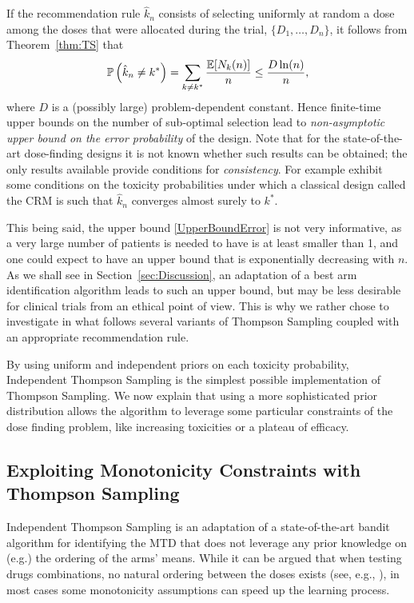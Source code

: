 If the recommendation rule $\hat{k}_n$ consists of selecting uniformly at random a dose among the doses that were allocated during the trial,  $\{D_1,\dots,D_n\}$, it follows from Theorem~\ref{thm:TS} that 
\begin{equation}\mathbb{P}\left(\hat k_n \neq k^*\right) = \sum_{k \neq k^*} \frac{\mathbb{E}[N_k(n)]}{n} \leq \frac{D\ln(n)}{n},\label{UpperBoundError}\end{equation}
where $D$ is a (possibly large) problem-dependent constant. Hence finite-time upper bounds on the number of sub-optimal selection lead to \emph{non-asymptotic upper bound on the error probability} of the design. Note that for the state-of-the-art dose-finding designs it is not known whether such results can be obtained; the only results available provide conditions for \emph{consistency}. For example \cite{ShenOQuigley96,CheungChappell02} exhibit some conditions on the toxicity probabilities under which a classical design called the CRM is such that $\hat{k}_n$ converges almost surely to $k^*$. 

This being said, the upper bound \eqref{UpperBoundError} is not very informative, as a very large number of patients is needed to have is at least smaller than 1, and one could expect to have an upper bound that is exponentially decreasing with $n$. As we shall see in Section~\ref{sec:Discussion}, an adaptation of a best arm identification algorithm \citep{icml2013_karnin13} leads to such an upper bound, but may be less desirable for clinical trials from an ethical point of view. This is why we rather chose to investigate in what follows several variants of Thompson Sampling coupled with an appropriate recommendation rule. 



By using uniform and independent priors on each toxicity probability, Independent Thompson Sampling is the simplest possible implementation of Thompson Sampling. We now explain that using a more sophisticated prior distribution allows the algorithm to leverage some particular constraints of the dose finding problem, like increasing toxicities or a plateau of efficacy.  



\subsection{Exploiting Monotonicity Constraints with Thompson Sampling}\label{sec:TS}

Independent Thompson Sampling is an adaptation of a state-of-the-art bandit algorithm for identifying the MTD that does not leverage any prior knowledge on (e.g.) the ordering of the arms' means. While it can be argued that when testing drugs combinations, no natural ordering between the doses exists (see, e.g., \cite{Mozgunov17CT}), in most cases some monotonicity assumptions can speed up the learning process. 


